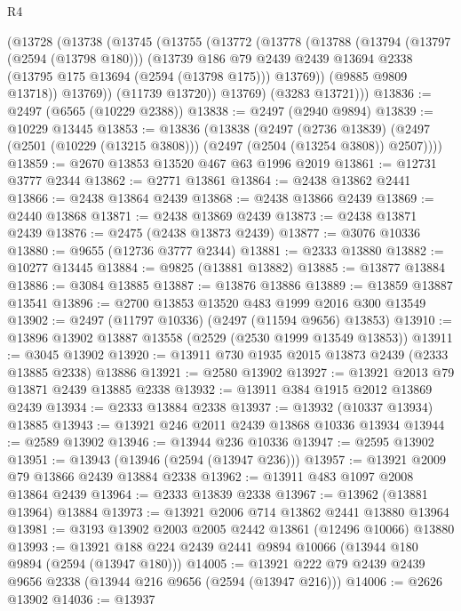 \begin{lexlean}{R4}
\begin{coremodule}
    (@13728
      (@13738
        (@13745
          (@13755
            (@13772
              (@13778
                (@13788
                  (@13794
                    (@13797 (@2594 (@13798 @180)))
                    (@13739
                      @186
                      @79
                      @2439
                      @2439
                      @13694
                      @2338
                      (@13795 @175 @13694 (@2594 (@13798 @175)))
                      @13769))
                  (@9885 @9809 @13718))
                @13769))
            (@11739 @13720))
          @13769)
        (@3283 @13721)))
@13836 := @2497 (@6565 (@10229 @2388))
@13838 := @2497 (@2940 @9894)
@13839 := @10229 @13445
@13853 := @13836
    (@13838
      (@2497
        (@2736 @13839)
        (@2497 (@2501 (@10229 (@13215 @3808))) (@2497 (@2504 (@13254 @3808)) @2507))))
@13859 := @2670 @13853 @13520 @467 @63 @1996 @2019
@13861 := @12731 @3777 @2344
@13862 := @2771 @13861
@13864 := @2438 @13862 @2441
@13866 := @2438 @13864 @2439
@13868 := @2438 @13866 @2439
@13869 := @2440 @13868
@13871 := @2438 @13869 @2439
@13873 := @2438 @13871 @2439
@13876 := @2475 (@2438 @13873 @2439)
@13877 := @3076 @10336
@13880 := @9655 (@12736 @3777 @2344)
@13881 := @2333 @13880
@13882 := @10277 @13445
@13884 := @9825 (@13881 @13882)
@13885 := @13877 @13884
@13886 := @3084 @13885
@13887 := @13876 @13886
@13889 := @13859 @13887 @13541
@13896 := @2700 @13853 @13520 @483 @1999 @2016 @300 @13549
@13902 := @2497 (@11797 @10336) (@2497 (@11594 @9656) @13853)
@13910 := @13896 @13902 @13887 @13558 (@2529 (@2530 @1999 @13549 @13853))
@13911 := @3045 @13902
@13920 := @13911 @730 @1935 @2015 @13873 @2439 (@2333 @13885 @2338) @13886
@13921 := @2580 @13902
@13927 := @13921 @2013 @79 @13871 @2439 @13885 @2338
@13932 := @13911 @384 @1915 @2012 @13869 @2439
@13934 := @2333 @13884 @2338
@13937 := @13932 (@10337 @13934) @13885
@13943 := @13921 @246 @2011 @2439 @13868 @10336 @13934
@13944 := @2589 @13902
@13946 := @13944 @236 @10336
@13947 := @2595 @13902
@13951 := @13943 (@13946 (@2594 (@13947 @236)))
@13957 := @13921 @2009 @79 @13866 @2439 @13884 @2338
@13962 := @13911 @483 @1097 @2008 @13864 @2439
@13964 := @2333 @13839 @2338
@13967 := @13962 (@13881 @13964) @13884
@13973 := @13921 @2006 @714 @13862 @2441 @13880 @13964
@13981 := @3193 @13902 @2003 @2005 @2442 @13861 (@12496 @10066) @13880
@13993 := @13921 @188 @224 @2439 @2441 @9894 @10066 (@13944 @180 @9894 (@2594 (@13947 @180)))
@14005 := @13921 @222 @79 @2439 @2439 @9656 @2338 (@13944 @216 @9656 (@2594 (@13947 @216)))
@14006 := @2626 @13902
@14036 := @13937

\end{coremodule}
\end{lexlean}
